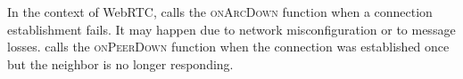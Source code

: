 In the context of WebRTC, \SPRAY calls the \textsc{onArcDown} function when a
connection establishment fails. It may happen due to network misconfiguration or
to message losses. \SPRAY calls the \textsc{onPeerDown} function when the
connection was established once but the neighbor is no longer responding.



